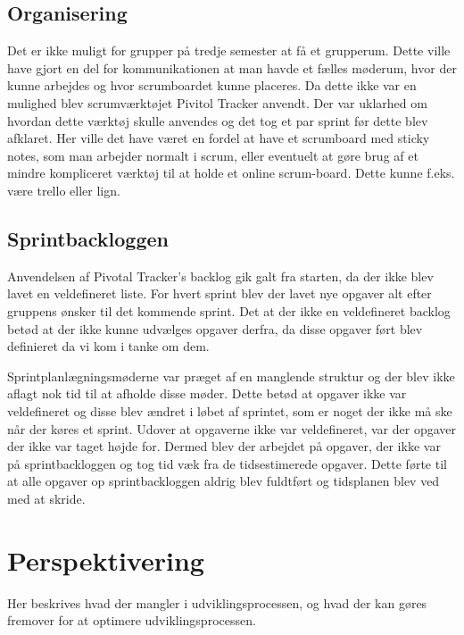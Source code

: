 \section{Organisering}
Det er ikke muligt for grupper på tredje semester at få et grupperum. Dette ville have gjort en del for kommunikationen at man havde et fælles møderum, hvor der kunne arbejdes og hvor scrumboardet kunne placeres. Da dette ikke var en mulighed blev scrumværktøjet Pivitol Tracker anvendt. Der var uklarhed om hvordan dette værktøj skulle anvendes og det tog et par sprint før dette blev afklaret. Her ville det have været en fordel at have et scrumboard med sticky notes, som man arbejder normalt i scrum, eller eventuelt at gøre brug af et mindre kompliceret værktøj til at holde et online scrum-board. Dette kunne f.eks. være trello eller lign. 

\section{Sprintbackloggen}
Anvendelsen af Pivotal Tracker's backlog gik galt fra starten, da der ikke blev lavet en veldefineret liste. For hvert sprint blev der lavet nye opgaver alt efter gruppens ønsker til det kommende sprint. Det at der ikke en veldefineret backlog betød at der ikke kunne udvælges opgaver derfra, da disse opgaver ført blev definieret da vi kom i tanke om dem. \par
Sprintplanlægningsmøderne var præget af en manglende struktur og der blev ikke aflagt nok tid til at afholde disse møder. Dette betød at opgaver ikke var veldefineret og disse blev ændret i løbet af sprintet, som er noget der ikke må ske når der køres et sprint. Udover at opgaverne ikke var veldefineret, var der opgaver der ikke var taget højde for. Dermed blev der arbejdet på opgaver, der ikke var på sprintbackloggen og tog tid væk fra de tidsestimerede opgaver. Dette førte til at alle opgaver op sprintbackloggen aldrig blev fuldtført og tidsplanen blev ved med at skride.  

\chapter{Perspektivering}
Her beskrives hvad der mangler i udviklingsprocessen, og hvad der kan gøres
fremover for at optimere udviklingsprocessen. 